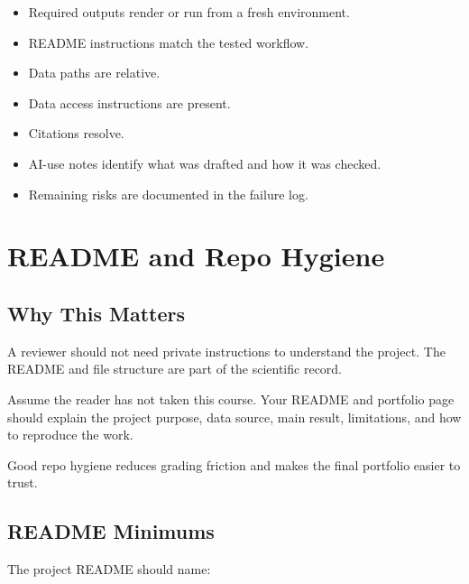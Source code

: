 \documentclass[
  letterpaper,
  DIV=11,
  numbers=noendperiod,
  oneside]{scrreprt}
\providecommand{\tightlist}{%
  \setlength{\itemsep}{0pt}\setlength{\parskip}{0pt}}
\begin{document}
\begin{itemize}
\tightlist
\item[$\square$]
  Required outputs render or run from a fresh environment.
\item[$\square$]
  README instructions match the tested workflow.
\item[$\square$]
  Data paths are relative.
\item[$\square$]
  Data access instructions are present.
\item[$\square$]
  Citations resolve.
\item[$\square$]
  AI-use notes identify what was drafted and how it was checked.
\item[$\square$]
  Remaining risks are documented in the failure log.
\end{itemize}

\chapter*{README and Repo Hygiene}\label{readme-and-repo-hygiene}


\section*{Why This Matters}\label{why-this-matters-3}


A reviewer should not need private instructions to understand the
project. The README and file structure are part of the scientific
record.

Assume the reader has not taken this course. Your README and portfolio
page should explain the project purpose, data source, main result,
limitations, and how to reproduce the work.

Good repo hygiene reduces grading friction and makes the final portfolio
easier to trust.

\section*{README Minimums}\label{readme-minimums}


The project README should name:
\end{document}
